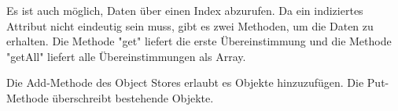 
Es ist auch möglich, Daten über einen Index abzurufen. Da ein indiziertes 
Attribut nicht eindeutig sein muss, gibt es zwei Methoden, um die Daten zu erhalten. Die Methode "get" liefert die erste Übereinstimmung und die Methode "getAll" liefert alle Übereinstimmungen als Array.


Die Add-Methode des Object Stores erlaubt es Objekte hinzuzufügen. Die Put-Methode überschreibt bestehende Objekte.
\cite{MDNIndexedDB}
\cite{MDNUsingIndexedDB}